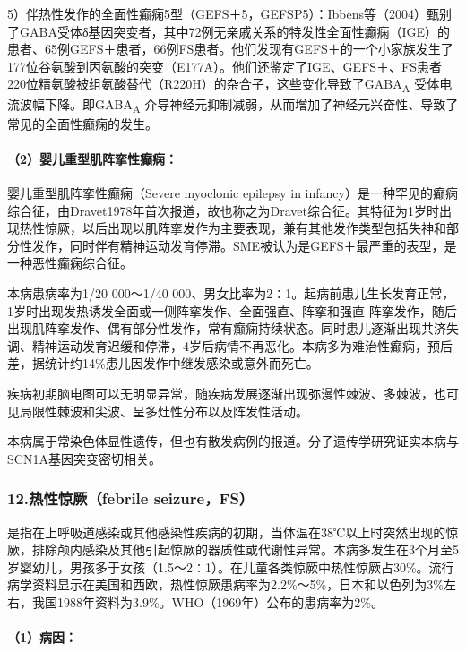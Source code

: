 5）伴热性发作的全面性癫痫5型（GEFS＋5，GEFSP5）：Ibbens等（2004）甄别了GABA受体δ基因突变者，其中72例无亲戚关系的特发性全面性癫痫（IGE）的患者、65例GEFS＋患者，66例FS患者。他们发现有GEFS＋的一个小家族发生了177位谷氨酸到丙氨酸的突变（E177A）。他们还鉴定了IGE、GEFS＋、FS患者220位精氨酸被组氨酸替代（R220H）的杂合子，这些变化导致了GABA\textsubscript{A}
受体电流波幅下降。即GABA\textsubscript{A}
介导神经元抑制减弱，从而增加了神经元兴奋性、导致了常见的全面性癫痫的发生。

\paragraph{（2）婴儿重型肌阵挛性癫痫：}

婴儿重型肌阵挛性癫痫（Severe myoclonic epilepsy in
infancy）是一种罕见的癫痫综合征，由Dravet1978年首次报道，故也称之为Dravet综合征。其特征为1岁时出现热性惊厥，以后出现以肌阵挛发作为主要表现，兼有其他发作类型包括失神和部分性发作，同时伴有精神运动发育停滞。SME被认为是GEFS＋最严重的表型，是一种恶性癫痫综合征。

本病患病率为1/20 000～1/40
000、男女比率为2∶1。起病前患儿生长发育正常，1岁时出现发热诱发全面或一侧阵挛发作、全面强直、阵挛和强直-阵挛发作，随后出现肌阵挛发作、偶有部分性发作，常有癫痫持续状态。同时患儿逐渐出现共济失调、精神运动发育迟缓和停滞，4岁后病情不再恶化。本病多为难治性癫痫，预后差，据统计约14\%患儿因发作中继发感染或意外而死亡。

疾病初期脑电图可以无明显异常，随疾病发展逐渐出现弥漫性棘波、多棘波，也可见局限性棘波和尖波、呈多灶性分布以及阵发性活动。

本病属于常染色体显性遗传，但也有散发病例的报道。分子遗传学研究证实本病与SCN1A基因突变密切相关。

\subsubsection{12.热性惊厥（febrile seizure，FS）}

是指在上呼吸道感染或其他感染性疾病的初期，当体温在38℃以上时突然出现的惊厥，排除颅内感染及其他引起惊厥的器质性或代谢性异常。本病多发生在3个月至5岁婴幼儿，男孩多于女孩（1.5～2∶1）。在儿童各类惊厥中热性惊厥占30\%。流行病学资料显示在美国和西欧，热性惊厥患病率为2.2\%～5\%，日本和以色列为3\%左右，我国1988年资料为3.9\%。WHO（1969年）公布的患病率为2\%。

\paragraph{（1）病因：}

